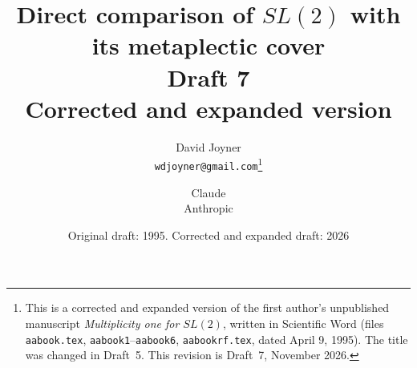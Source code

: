 \documentclass[12pt,letterpaper,openany]{book}
\theoremstyle{plain}
\theoremstyle{definition}
\theoremstyle{remark}
\theoremstyle{remark}
\begin{document}
\author{David Joyner\\[0.5ex] \normalsize\texttt{wdjoyner@gmail.com}\thanks{This is a corrected and expanded
version of the first author's unpublished manuscript \emph{Multiplicity one for
$SL(2)$}, written in Scientific Word (files \texttt{aabook.tex},
\texttt{aabook1}--\texttt{aabook6}, \texttt{aabookrf.tex}, dated April 9,
1995). The title was changed in Draft~5.
This revision is Draft~7, November 2026.}
\and Claude\\[0.5ex] \normalsize Anthropic}
\title{Direct comparison of $SL(2)$ with its metaplectic cover\\[2ex]
\large Draft 7\\[0.5ex] Corrected and expanded version}
\date{Original draft: 1995. Corrected and expanded draft: 2026}
\maketitle
\end{document}
